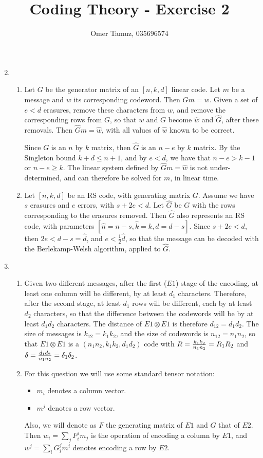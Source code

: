 \documentclass[11pt]{article} \usepackage{amssymb}
\newcommand{\half}{{\textstyle \frac12}}
\begin{document}
\title{Coding Theory - Exercise 2}

 \author{Omer Tamuz, 035696574}
\maketitle

\begin{enumerate}
\setcounter{enumi}{1}
\item 
\begin{enumerate}
\item
Let $G$ be the generator matrix of an $[n,k,d]$ linear code. Let $m$ be
a message and $w$ its corresponding codeword. Then $Gm=w$. Given a
set of $e<d$ erasures, remove these characters from $w$, and remove
the corresponding rows from $G$, so that $w$ and $G$ become $\hat{w}$ and $\hat{G}$, 
after these removals. 
Then $\hat{G}m=\hat{w}$, with all values of $\hat{w}$
known to be correct.

Since $G$ is an $n$ by $k$ matrix, then $\hat{G}$ is an $n-e$ by $k$
matrix. By the Singleton bound $k+d\leq n+1$, and by $e<d$, we 
have that $n-e>k-1$ or $n-e\geq k$. The
linear system defined by  $\hat{G}m=\hat{w}$ is not under-determined,
and can therefore be solved for $m$, in linear time.
\item
Let $[n,k,d]$ be an RS code, with generating matrix $G$. 
Assume we have $s$ erasures and $e$ errors, with $s+2e<d$. Let $\hat{G}$
be $G$ with the rows corresponding to the erasures removed. Then
$\hat{G}$ also represents an RS code, with parameters 
$[\hat{n}=n-s, \hat{k}=k, \hat{d}=d-s]$. Since $s+2e<d$, then 
$2e<d-s=\hat{d}$, and $e<\half\hat{d}$, so that the message can be
decoded with the Berlekamp-Welsh algorithm, applied to $\hat{G}$.
\end{enumerate}
\item
\begin{enumerate}
\item
Given two different messages, after the first ($E1$) stage of
the encoding, at least one column will be different, by at least
$d_1$ characters. Therefore, after the second stage,
at least $d_1$ rows will be different, each by at least $d_2$
characters, so that the difference between the codewords 
will be by at least $d_1d_2$ characters.
The distance of $E1\otimes E1$ is therefore $d_{12}=d_1d_2$. 
The size of messages is $k_{12}=k_1k_2$, and the
size of codewords is $n_{12}=n_1n_2$, so that $E1\otimes E1$ is a
$(n_1n_2,k_1k_2,d_1d_2)$ code with $R={k_1k_2\over n_1n_2}=R_1R_2$
and $\delta = {d_1d_2\over n_1n_2}=\delta_1\delta_2$.
\item
For this question we will use some standard tensor notation:
\begin{itemize}
\item $m_i$ denotes a column vector.
\item $m^j$ denotes a row vector.
\end{itemize}
 Also, we will denote as $F$ the generating matrix of $E1$ and $G$ that 
of $E2$. Then
$w_i=\sum_jF_i^jm_j$ is the operation
of encoding a column by $E1$, and $w^j=\sum_iG^j_im^i$ denotes encoding
a row by $E2$.


\end{enumerate}
\end{enumerate}
\end{document}
